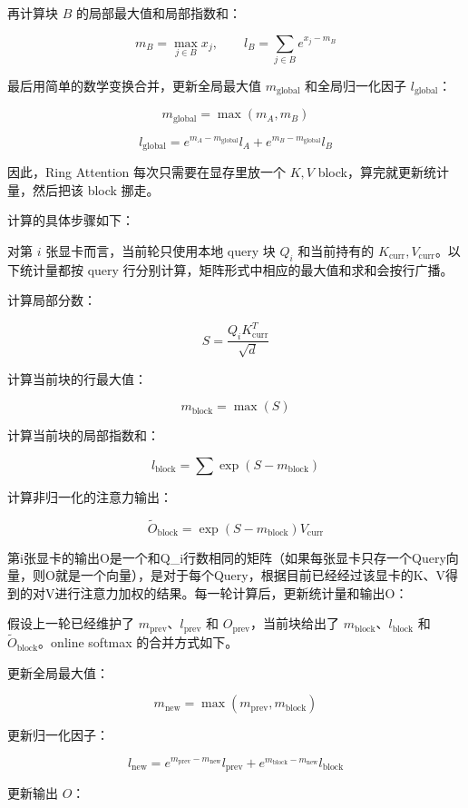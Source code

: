 再计算块 \(B\) 的局部最大值和局部指数和：

\[
m_B = \max_{j \in B} x_j,\qquad
l_B = \sum_{j \in B} e^{x_j - m_B}
\]

最后用简单的数学变换合并，更新全局最大值 \(m_{\mathrm{global}}\) 和全局归一化因子 \(l_{\mathrm{global}}\)：

\[
m_{\mathrm{global}} = \max(m_A, m_B)
\]

\[
l_{\mathrm{global}} =
e^{m_A - m_{\mathrm{global}}} l_A
+ e^{m_B - m_{\mathrm{global}}} l_B
\]

因此，Ring Attention 每次只需要在显存里放一个 \(K, V\) block，算完就更新统计量，然后把该 block 挪走。

计算的具体步骤如下：

对第 \(i\) 张显卡而言，当前轮只使用本地 query 块 \(Q_i\) 和当前持有的 \(K_{\mathrm{curr}}, V_{\mathrm{curr}}\)。以下统计量都按 query 行分别计算，矩阵形式中相应的最大值和求和会按行广播。

计算局部分数：

\[
S = \frac{Q_i K_{\mathrm{curr}}^T}{\sqrt{d}}
\]

计算当前块的行最大值：

\[
m_{\mathrm{block}} = \max(S)
\]

计算当前块的局部指数和：

\[
l_{\mathrm{block}} = \sum \exp(S - m_{\mathrm{block}})
\]

计算非归一化的注意力输出：

\[
\tilde O_{\mathrm{block}} = \exp(S - m_{\mathrm{block}}) V_{\mathrm{curr}}
\]

第i张显卡的输出O是一个和Q\_i行数相同的矩阵（如果每张显卡只存一个Query向量，则O就是一个向量），是对于每个Query，根据目前已经经过该显卡的K、V得到的对V进行注意力加权的结果。每一轮计算后，更新统计量和输出O：

假设上一轮已经维护了 \(m_{\mathrm{prev}}\)、\(l_{\mathrm{prev}}\) 和 \(O_{\mathrm{prev}}\)，当前块给出了 \(m_{\mathrm{block}}\)、\(l_{\mathrm{block}}\) 和 \(\tilde O_{\mathrm{block}}\)。online softmax 的合并方式如下。

更新全局最大值：

\[
m_{\mathrm{new}} = \max(m_{\mathrm{prev}}, m_{\mathrm{block}})
\]

更新归一化因子：

\[
l_{\mathrm{new}} =
e^{m_{\mathrm{prev}} - m_{\mathrm{new}}} l_{\mathrm{prev}}
+ e^{m_{\mathrm{block}} - m_{\mathrm{new}}} l_{\mathrm{block}}
\]

更新输出 \(O\)：

